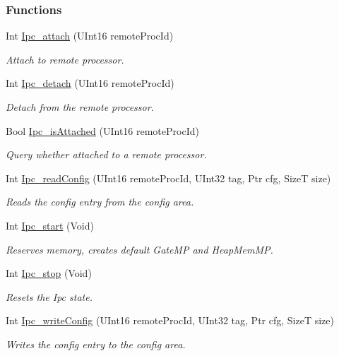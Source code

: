 \subsubsection*{Functions}
\begin{DoxyCompactItemize}
\item 
Int \hyperlink{_ipc_8h_a170f84915df79377080be708302bcb08}{Ipc\_\-attach} (UInt16 remoteProcId)
\begin{DoxyCompactList}\small\item\em Attach to remote processor. \item\end{DoxyCompactList}\item 
Int \hyperlink{_ipc_8h_abd0bc0fb5d84415b441c7050f92826c0}{Ipc\_\-detach} (UInt16 remoteProcId)
\begin{DoxyCompactList}\small\item\em Detach from the remote processor. \item\end{DoxyCompactList}\item 
Bool \hyperlink{_ipc_8h_a6c17c41b2d25e8b69208082126cde887}{Ipc\_\-isAttached} (UInt16 remoteProcId)
\begin{DoxyCompactList}\small\item\em Query whether attached to a remote processor. \item\end{DoxyCompactList}\item 
Int \hyperlink{_ipc_8h_a4a5c82ebf2441ebf3fa86e6e7dc917d7}{Ipc\_\-readConfig} (UInt16 remoteProcId, UInt32 tag, Ptr cfg, SizeT size)
\begin{DoxyCompactList}\small\item\em Reads the config entry from the config area. \item\end{DoxyCompactList}\item 
Int \hyperlink{_ipc_8h_aca550c6a5498637cfec7b0f4e6d07828}{Ipc\_\-start} (Void)
\begin{DoxyCompactList}\small\item\em Reserves memory, creates default GateMP and HeapMemMP. \item\end{DoxyCompactList}\item 
Int \hyperlink{_ipc_8h_ae47b1d9fa8486f162c836f142f0ab2ee}{Ipc\_\-stop} (Void)
\begin{DoxyCompactList}\small\item\em Resets the Ipc state. \item\end{DoxyCompactList}\item 
Int \hyperlink{_ipc_8h_af3b2fb0c66ad86f148870202b1b7aca1}{Ipc\_\-writeConfig} (UInt16 remoteProcId, UInt32 tag, Ptr cfg, SizeT size)
\begin{DoxyCompactList}\small\item\em Writes the config entry to the config area. \item\end{DoxyCompactList}\end{DoxyCompactItemize}



